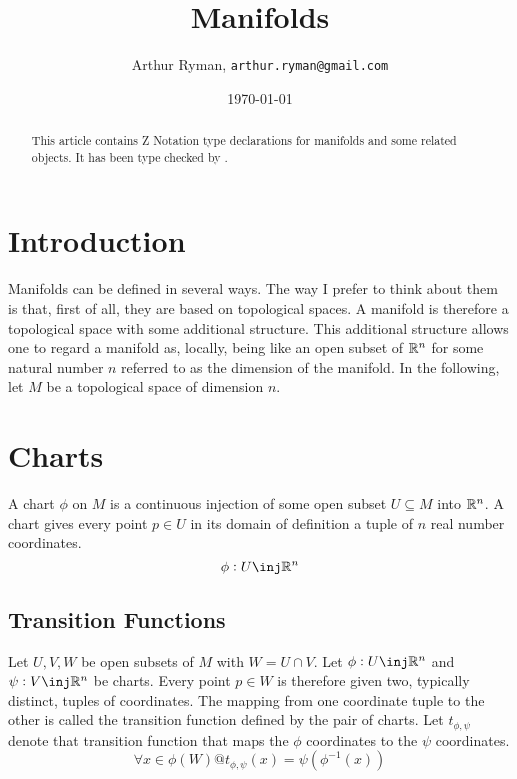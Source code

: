 \documentclass[11pt, oneside]{article}
\title{Manifolds}
\author{Arthur Ryman, {\tt arthur.ryman@gmail.com}}
\date{\today}
\begin{document}
\maketitle

\begin{abstract}
This article contains Z Notation type declarations for manifolds and some related objects.
It has been type checked by \fuzz.
\end{abstract}

\tableofcontents


    \section{Introduction}

    Manifolds can be defined in several ways.
    The way I prefer to think about them is that, first of all, they are  based on topological spaces.
    A manifold is therefore a topological space with some additional structure.
    This additional structure allows one to regard a manifold as, locally, being like an open subset of $\mathbb{R}^n$
    for some natural number $n$ referred to as the dimension of the manifold.
    In the following, let $M$ be a topological space of dimension $n$.

    \section{Charts}
    A chart $\phi$ on $M$ is a continuous injection of some open subset $U \subseteq M$ into $\mathbb{R}^n$.
    A chart gives every point $p \in U$ in its domain of definition a tuple of $n$ real number coordinates.
    \begin{equation}
        \phi: U \inj \R^n
    \end{equation}

    \subsection{Transition Functions}
    Let $U, V, W$ be open subsets of $M$ with $W = U \cap V$.
    Let $\phi: U \inj \R^n$ and $\psi: V \inj \R^n$ be charts.
    Every point $p \in W$ is therefore given two, typically distinct, tuples of coordinates.
    The mapping from one coordinate tuple to the other is called the transition function defined by the pair of charts.
    Let $t_{\phi,\psi}$ denote that transition function that maps the $\phi$ coordinates to the $\psi$ coordinates.
    \begin{equation}
        \forall x \in \phi(W) @ t_{\phi,\psi}(x) = \psi(\phi^{-1}(x))
    \end{equation}
\end{document}
